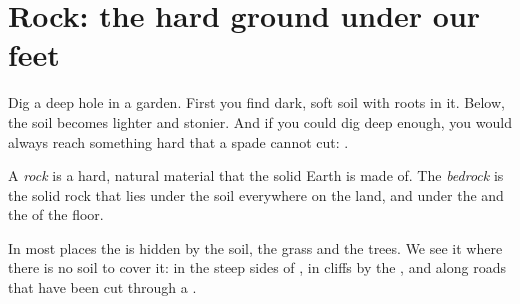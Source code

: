 \section{Rock: the hard ground under our feet}

Dig a deep hole in a garden. First you find dark, soft soil with roots in
it. Below, the soil becomes lighter and stonier. And if you could dig deep
enough, you would always reach something hard that a spade cannot cut:
.

\begin{definition}\label{def:g3:stones-pebbles-sand:rock}
A \emph{rock} is a hard, natural material that the solid Earth
is made of. The \emph{bedrock} is the solid rock that lies
under the soil everywhere on the land, and under the  and the  of
the  floor.
\end{definition}

In most places the  is hidden by the soil, the grass and the trees.
We see it where there is no soil to cover it: in the steep sides of
, in cliffs by the , and along roads that have been cut through
a .

